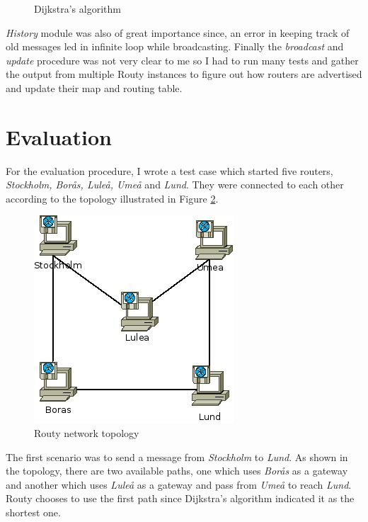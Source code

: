 \documentclass[a4paper, 11pt]{article}
\begin{document}
\begin{figure}[h!]
    
    \caption{Dijkstra's algorithm}
    \label{fig:dijkstra}
\end{figure}

\emph{History} module was also of great importance since, an error in keeping
track of old messages led in infinite loop while broadcasting. Finally the
\emph{broadcast} and \emph{update} procedure was not very clear to me so I had
to run many tests and gather the output from multiple Routy instances to figure
out how routers are advertised and update their map and routing table.

\section{Evaluation}

For the evaluation procedure, I wrote a test case which started five routers,
\emph{Stockholm, Bor\aa s, Lule\aa, Ume\aa}  and \emph{Lund}. They were
connected to each other according to the topology illustrated in Figure
\ref{fig:topology}.

\begin{figure}
    \begin{center}
        \includegraphics[scale=0.6]{network.jpeg}
        \caption{Routy network topology}
        \label{fig:topology}
    \end{center}
\end{figure}

The first scenario was to send a message from \emph{Stockholm} to \emph{Lund}.
As shown in the topology, there are two available paths, one which uses
\emph{Bor\aa s} as a gateway and another which uses \emph{Lule\aa} as a gateway
and pass from \emph{Ume\aa} to reach \emph{Lund}. Routy chooses to use the first
path since Dijkstra's algorithm indicated it as the shortest one.
\end{document}
